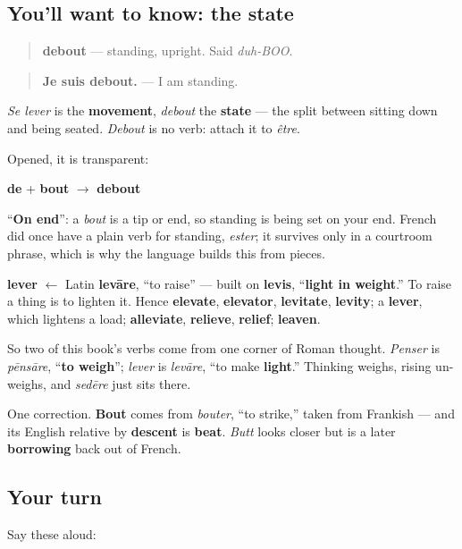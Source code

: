 \subsection*{You'll want to know: the state}
\begin{quote}
\textbf{debout} — standing, upright. Said \emph{duh-BOO}.
\end{quote}

\begin{quote}
\textbf{Je suis debout.} — I am standing.
\end{quote}

\emph{Se lever} is the \textbf{movement}, \emph{debout} the \textbf{state} — the split between sitting down and being seated. \emph{Debout} is no verb: attach it to \emph{être}.

Opened, it is transparent:

\textbf{de} + \textbf{bout} $\to$ \textbf{debout}

\textquotedblleft{}\textbf{On end}\textquotedblright{}: a \emph{bout} is a tip or end, so standing is being set on your end. French did once have a plain verb for standing, \emph{ester}; it survives only in a courtroom phrase, which is why the language builds this from pieces.

\begin{cousinweb}
\textbf{lever} $\leftarrow$ Latin \textbf{levāre}, \textquotedblleft{}to raise\textquotedblright{} — built on \textbf{levis}, \textquotedblleft{}\textbf{light in weight}.\textquotedblright{} To raise a thing is to lighten it. Hence \textbf{elevate}, \textbf{elevator}, \textbf{levitate}, \textbf{levity}; a \textbf{lever}, which lightens a load; \textbf{alleviate}, \textbf{relieve}, \textbf{relief}; \textbf{leaven}.

So two of this book's verbs come from one corner of Roman thought. \emph{Penser} is \emph{pēnsāre}, \textquotedblleft{}\textbf{to weigh}\textquotedblright{}; \emph{lever} is \emph{levāre}, \textquotedblleft{}to make \textbf{light}.\textquotedblright{} Thinking weighs, rising un-weighs, and \emph{sedēre} just sits there.

One correction. \textbf{Bout} comes from \emph{bouter}, \textquotedblleft{}to strike,\textquotedblright{} taken from Frankish — and its English relative by \textbf{descent} is \textbf{beat}. \emph{Butt} looks closer but is a later \textbf{borrowing} back out of French.
\end{cousinweb}

\subsection*{Your turn}
Say these aloud:

